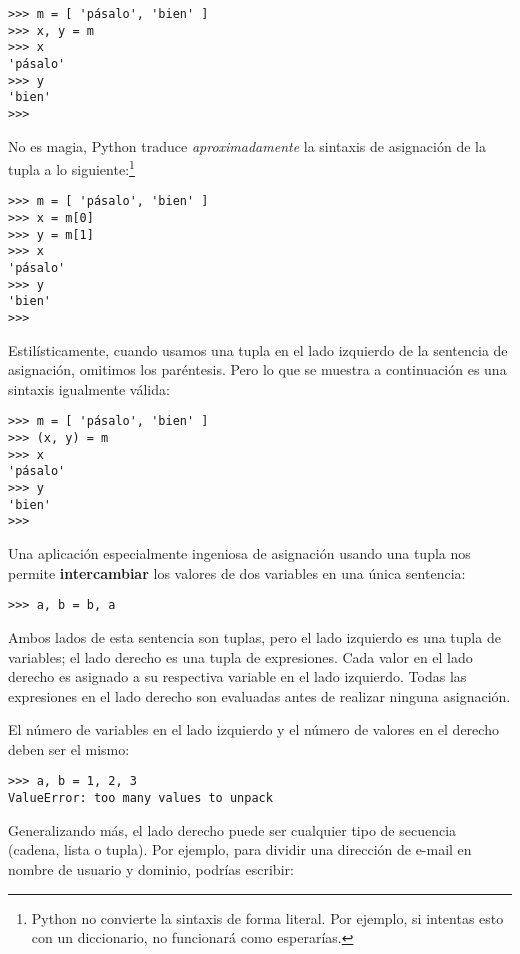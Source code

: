\beforeverb
\begin{verbatim}
>>> m = [ 'pásalo', 'bien' ]
>>> x, y = m
>>> x
'pásalo'
>>> y
'bien'
>>> 
\end{verbatim}
\afterverb
%
No es magia, Python traduce \emph{aproximadamente} la
sintaxis de asignación de la tupla
a lo siguiente:\footnote{Python no convierte la
sintaxis de forma literal. Por ejemplo, si intentas esto con un diccionario,
no funcionará como esperarías.}

\beforeverb
\begin{verbatim}
>>> m = [ 'pásalo', 'bien' ]
>>> x = m[0]
>>> y = m[1]
>>> x
'pásalo'
>>> y
'bien'
>>> 
\end{verbatim}
\afterverb

Estilísticamente, cuando usamos una tupla en el lado izquierdo de la sentencia
de asignación, omitimos los paréntesis. Pero lo que se muestra a continuación
es una sintaxis igualmente válida:

\beforeverb
\begin{verbatim}
>>> m = [ 'pásalo', 'bien' ]
>>> (x, y) = m
>>> x
'pásalo'
>>> y
'bien'
>>> 
\end{verbatim}
\afterverb
%
Una aplicación especialmente ingeniosa de asignación usando una tupla nos
permite {\bf intercambiar} los valores de dos variables en una única sentencia:

\beforeverb
\begin{verbatim}
>>> a, b = b, a
\end{verbatim}
\afterverb
%
Ambos lados de esta sentencia son tuplas, pero
el lado izquierdo es una tupla de variables; el lado derecho es una tupla
de expresiones. Cada valor en el lado derecho
es asignado a su respectiva variable en el lado izquierdo.
Todas las expresiones en el lado derecho son evaluadas antes de
realizar ninguna asignación.

El número de variables en el lado izquierdo y el número de
valores en el derecho deben ser el mismo:


\beforeverb
\begin{verbatim}
>>> a, b = 1, 2, 3
ValueError: too many values to unpack
\end{verbatim}
\afterverb
%
Generalizando más, el lado derecho puede ser cualquier tipo de secuencia
(cadena, lista o tupla). Por ejemplo, para dividir una dirección de e-mail
en nombre de usuario y dominio, podrías escribir:


